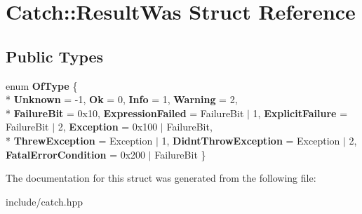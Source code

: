 \hypertarget{structCatch_1_1ResultWas}{}\section{Catch\+:\+:Result\+Was Struct Reference}
\label{structCatch_1_1ResultWas}
\subsection*{Public Types}
\begin{DoxyCompactItemize}
\item 
enum {\bfseries Of\+Type} \{ \\*
{\bfseries Unknown} = -\/1, 
{\bfseries Ok} = 0, 
{\bfseries Info} = 1, 
{\bfseries Warning} = 2, 
\\*
{\bfseries Failure\+Bit} = 0x10, 
{\bfseries Expression\+Failed} = Failure\+Bit $\vert$ 1, 
{\bfseries Explicit\+Failure} = Failure\+Bit $\vert$ 2, 
{\bfseries Exception} = 0x100 $\vert$ Failure\+Bit, 
\\*
{\bfseries Threw\+Exception} = Exception $\vert$ 1, 
{\bfseries Didnt\+Throw\+Exception} = Exception $\vert$ 2, 
{\bfseries Fatal\+Error\+Condition} = 0x200 $\vert$ Failure\+Bit
 \}\hypertarget{structCatch_1_1ResultWas_a624e1ee3661fcf6094ceef1f654601ef}{}\label{structCatch_1_1ResultWas_a624e1ee3661fcf6094ceef1f654601ef}

\end{DoxyCompactItemize}


The documentation for this struct was generated from the following file\+:\begin{DoxyCompactItemize}
\item 
include/catch.\+hpp\end{DoxyCompactItemize}
